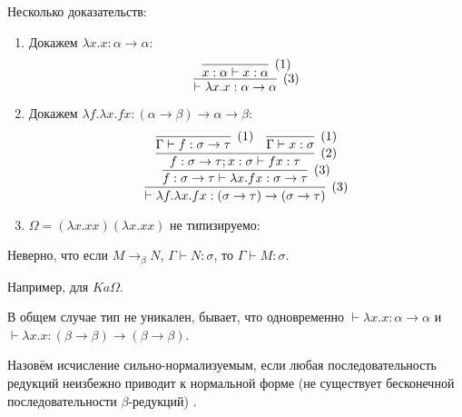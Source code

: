 \begin{example} Несколько доказательств:
    \begin{enumerate}
        \item Докажем $\lambda x . x : \alpha \rightarrow \alpha$:
        \[
            \infer[(3)]
                {\vdash \lambda x . x : \alpha \rightarrow \alpha}
                { \infer[(1)]
                    {x : \alpha \vdash x : \alpha}
                    {}
                }
        \]

        \item Докажем $\lambda f . \lambda x . f x : (\alpha \rightarrow \beta) \rightarrow \alpha \rightarrow \beta$:
        \[
            \infer[(3)]
                { \vdash \lambda f . \lambda x . f x : (\sigma \rightarrow \tau) \rightarrow (\sigma \rightarrow \tau) }
                { \infer[(3)]
                    { f : \sigma \rightarrow \tau \vdash \lambda x . f x : \sigma \rightarrow \tau }
                    { \infer[(2)]
                        {f : \sigma \rightarrow \tau; x : \sigma \vdash f x : \tau}
                        {
                            \infer[(1)]{ \Gamma \vdash f : \sigma \rightarrow \tau }{} &
                            \infer[(1)]{ \Gamma \vdash x : \sigma }{}
                        }
                    }
                }
        \]

        \item $\Omega = (\lambda x . x x) (\lambda x . x x)$ не типизируемо:
            \todo %
    \end{enumerate}
\end{example}

\begin{lemma}
    Неверно, что если $M \rightarrow_{\beta} N$, $\Gamma \vdash N : \sigma$, то $\Gamma \vdash M : \sigma$.
\end{lemma}
Например, для $Ka\Omega$.

В общем случае тип не уникален, бывает, что одновременно $\vdash \lambda x . x : \alpha \rightarrow \alpha$ и $\vdash \lambda x . x : (\beta \rightarrow \beta) \rightarrow (\beta \rightarrow \beta)$.

\begin{definition}
    Назовём исчисление сильно-нормализуемым, если любая последовательность редукций неизбежно приводит к нормальной форме (не существует бесконечной последовательности $\beta$-редукций) .
\end{definition}

